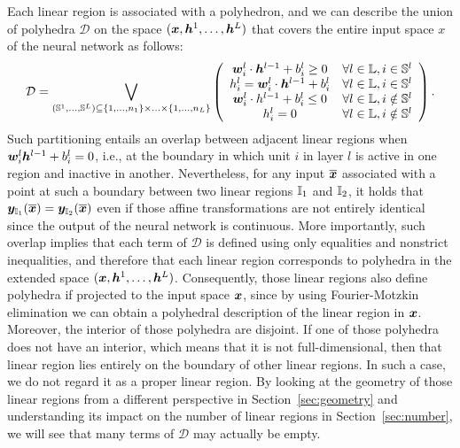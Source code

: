 Each linear region is associated with a polyhedron, 
and we can describe the union of polyhedra $\mathcal{D}$ on the space $({\bm{x}}, {\bm{h}}^1, \ldots, {\bm{h}}^L)$ that covers the entire input space $x$ of the neural network as follows:
\[
\mathcal{D} = 
\bigvee_{({\mathbb{S}}^1, \ldots, {\mathbb{S}}^{L}) \subseteq \{1, \ldots, n_1\} \times \ldots \times \{1, \ldots, n_{L}\} }
\left(
\begin{array}{cc}
{\bm{w}}_i^l \cdot {\bm{h}}^{l-1} + b_i^l \geq 0 & \forall l \in {\mathbb{L}}, i \in {\mathbb{S}}^l \\
h_i^l = {\bm{w}}_i^l \cdot {\bm{h}}^{l-1} + b_i^l & \forall l \in {\mathbb{L}}, i \in {\mathbb{S}}^l \\
{\bm{w}}_i^l \cdot h^{l-1} + b_i^l \leq 0 & \forall l \in {\mathbb{L}}, i \notin {\mathbb{S}}^l \\
h_i^l = 0 & \forall l \in {\mathbb{L}}, i \notin {\mathbb{S}}^l 
\end{array}
\right).
\]
Such partitioning entails an overlap between adjacent linear regions when ${\bm{w}}_i^l {\bm{h}}^{l-1} + b_i^l = 0$, i.e., at the boundary in which unit $i$ in layer $l$ is active in one region and inactive in another. 
Nevertheless, for any input $\overline{{\bm{x}}}$ associated with a point at such a boundary between two linear regions ${\mathbb{I}}_1$ and ${\mathbb{I}}_2$, it holds that ${\bm{y}}_{{\mathbb{I}}_1}(\overline{{\bm{x}}}) = {\bm{y}}_{{\mathbb{I}}_2}(\overline{{\bm{x}}})$ even if those affine transformations are not entirely identical since the output of the neural network is continuous. More importantly, such overlap implies that each term of $\mathcal{D}$ is defined using only equalities and nonstrict inequalities, and therefore that each linear region corresponds to polyhedra in the extended space $({\bm{x}}, {\bm{h}}^1, \ldots, {\bm{h}}^{L})$. 
Consequently, those linear regions also define polyhedra if projected to the input space ${\bm{x}}$, 
since by using Fourier-Motzkin elimination \citep{Fourier,Motzkin} 
we can obtain a polyhedral description of the linear region in ${\bm{x}}$.  
Moreover, the interior of those polyhedra are disjoint. 
If one of those polyhedra does not have an interior, 
which means that it is not full-dimensional, 
then that linear region lies entirely on the boundary of other linear regions.
In such a case, we do not regard it as a proper linear region. 
By looking at the geometry of those linear regions from a different perspective in Section~\ref{sec:geometry} and understanding its impact on the number of linear regions in Section~\ref{sec:number}, we will see that many terms of $\mathcal{D}$ may actually be empty.


